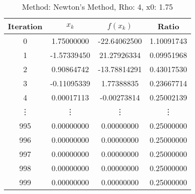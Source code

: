 \begin{table}
\centering
\caption{Method: Newton's Method, Rho: 4, x0: 1.75}
\label{tab:table_Newton's_Method_4_1_75}
\begin{tabular}{c c c c}
\toprule
Iteration &       $x_k$ &     $f(x_k)$ &      Ratio \\
\midrule
        0 &  1.75000000 & -22.64062500 & 1.10091743 \\
        1 & -1.57339450 &  21.27926334 & 0.09951968 \\
        2 &  0.90864742 & -13.78814291 & 0.43017530 \\
        3 & -0.11095339 &   1.77388835 & 0.23667714 \\
        4 &  0.00017113 &  -0.00273814 & 0.25002139 \\
   \vdots &      \vdots &       \vdots &     \vdots \\
      995 &  0.00000000 &   0.00000000 & 0.25000000 \\
      996 &  0.00000000 &   0.00000000 & 0.25000000 \\
      997 &  0.00000000 &   0.00000000 & 0.25000000 \\
      998 &  0.00000000 &   0.00000000 & 0.25000000 \\
      999 &  0.00000000 &   0.00000000 & 0.25000000 \\
\bottomrule
\end{tabular}
\end{table}
